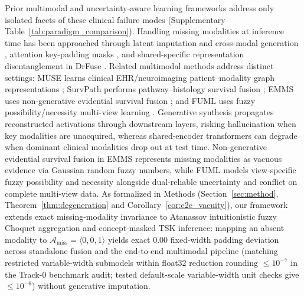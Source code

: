 \documentclass[10pt,twocolumn]{article}
\begin{document}
Prior multimodal and uncertainty-aware learning frameworks address only isolated facets of
these clinical failure modes (Supplementary Table~\ref{tab:paradigm_comparison}).
\label{sec:related}
Handling missing modalities at inference time has been approached through latent imputation and
cross-modal generation \cite{ma2021smil}, attention key-padding masks
\cite{vaswani2017attention,shaik2024survey}, and shared-specific representation
disentanglement in DrFuse \cite{yao2024drfuse}. Related multimodal methods address distinct
settings: MUSE learns clinical EHR/neuroimaging patient--modality graph representations
\cite{wu2024muse}; SurvPath performs pathway--histology survival fusion
\cite{jaume2024survpath}; EMMS uses non-generative evidential survival fusion
\cite{xing2026emms}; and FUML uses fuzzy possibility/necessity multi-view learning
\cite{duan2025fuml}. Generative synthesis \cite{ma2021smil} propagates reconstructed
activations through downstream layers, risking hallucination when key modalities are
unacquired, whereas shared-encoder transformers \cite{vaswani2017attention,yao2024drfuse} can
degrade when dominant clinical modalities drop out at test time. Non-generative evidential
survival fusion in EMMS \cite{xing2026emms} represents missing modalities as vacuous evidence
via Gaussian random fuzzy numbers, while FUML \cite{duan2025fuml} models view-specific fuzzy
possibility and necessity alongside dual-reliable uncertainty and conflict on complete
multi-view data.
As formalized in Methods (Section~\ref{sec:method}, Theorem~\ref{thm:degeneration} and
Corollary~\ref{cor:e2e_vacuity}), our framework extends exact
missing-modality invariance to Atanassov intuitionistic fuzzy Choquet aggregation and
concept-masked TSK inference: mapping an absent modality to $\mathcal{A}_{\text{miss}} =
\langle 0, 0, 1\rangle$ yields exact $0.00$ fixed-width padding deviation across standalone
fusion and the end-to-end multimodal pipeline (matching restricted variable-width submodels
within float32 reduction rounding $\le 10^{-7}$ in the Track-0 benchmark audit; tested
default-scale variable-width unit checks give $\le 10^{-6}$) without generative imputation.
\end{document}
